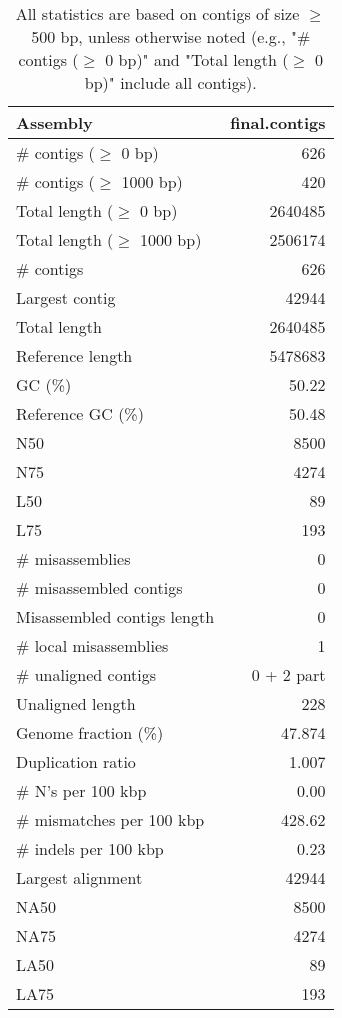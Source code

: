 \documentclass[12pt,a4paper]{article}
\begin{document}
\begin{table}[ht]
\begin{center}
\caption{All statistics are based on contigs of size $\geq$ 500 bp, unless otherwise noted (e.g., "\# contigs ($\geq$ 0 bp)" and "Total length ($\geq$ 0 bp)" include all contigs).}
\begin{tabular}{|l*{1}{|r}|}
\hline
Assembly & final.contigs \\ \hline
\# contigs ($\geq$ 0 bp) & 626 \\ \hline
\# contigs ($\geq$ 1000 bp) & 420 \\ \hline
Total length ($\geq$ 0 bp) & 2640485 \\ \hline
Total length ($\geq$ 1000 bp) & 2506174 \\ \hline
\# contigs & 626 \\ \hline
Largest contig & 42944 \\ \hline
Total length & 2640485 \\ \hline
Reference length & 5478683 \\ \hline
GC (\%) & 50.22 \\ \hline
Reference GC (\%) & 50.48 \\ \hline
N50 & 8500 \\ \hline
N75 & 4274 \\ \hline
L50 & 89 \\ \hline
L75 & 193 \\ \hline
\# misassemblies & 0 \\ \hline
\# misassembled contigs & 0 \\ \hline
Misassembled contigs length & 0 \\ \hline
\# local misassemblies & 1 \\ \hline
\# unaligned contigs & 0 + 2 part \\ \hline
Unaligned length & 228 \\ \hline
Genome fraction (\%) & 47.874 \\ \hline
Duplication ratio & 1.007 \\ \hline
\# N's per 100 kbp & 0.00 \\ \hline
\# mismatches per 100 kbp & 428.62 \\ \hline
\# indels per 100 kbp & 0.23 \\ \hline
Largest alignment & 42944 \\ \hline
NA50 & 8500 \\ \hline
NA75 & 4274 \\ \hline
LA50 & 89 \\ \hline
LA75 & 193 \\ \hline
\end{tabular}
\end{center}
\end{table}
\end{document}
